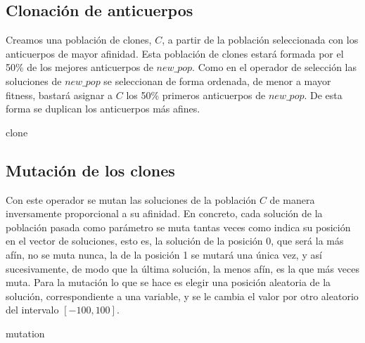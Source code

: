 \documentclass[10pt,a4paper]{article}
\begin{document}
\subsection{Clonación de anticuerpos}

Creamos una población de clones, $C$, a partir de la población seleccionada con los anticuerpos de mayor afinidad. Esta población de clones estará formada por el 50\% de los mejores anticuerpos de $new\_pop$. Como en el operador de  selección las soluciones de $new\_pop$ se seleccionan de forma ordenada, de menor a mayor fitness, bastará asignar a $C$ los 50\% primeros anticuerpos de $new\_pop$. De esta forma se duplican los anticuerpos más afines. 

\begin{algorithm}[H]
	\DontPrintSemicolon
	\caption{{\sc clone} }
\end{algorithm}

\subsection{Mutación de los clones}

Con este operador se mutan las soluciones de la población $C$ de manera inversamente proporcional a su afinidad. En concreto, cada solución de la población pasada como parámetro se muta tantas veces como indica su posición en el vector de soluciones, esto es, la solución de la posición 0, que será la más afín, no se muta nunca, la de la posición 1 se mutará una única vez, y así sucesivamente, de modo que la última solución, la menos afín, es la que más veces muta. Para la mutación lo que se hace es elegir una posición aleatoria de la solución, correspondiente a una variable, y se le cambia el valor por otro aleatorio del intervalo $[-100,100]$. 

\begin{algorithm}[H]
	\DontPrintSemicolon
	\caption{{\sc mutation} }
\end{algorithm}
\end{document}
